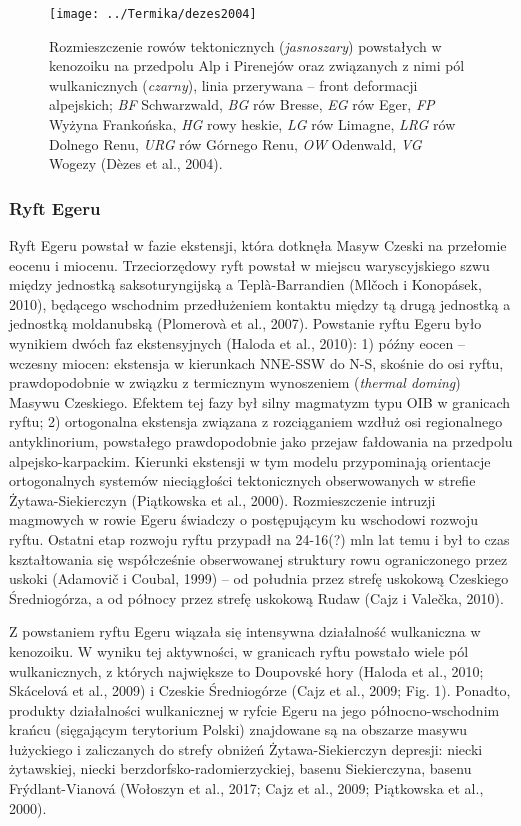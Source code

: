 \documentclass[11.5pt,twoside]{report}
\begin{document}
\begin{figure}[h]
	\centering
	\texttt{[image: ../Termika/dezes2004]}
	\caption{Rozmieszczenie rowów tektonicznych (\textit{jasnoszary}) powstałych w kenozoiku na przedpolu Alp i Pirenejów oraz związanych z nimi pól wulkanicznych (\textit{czarny}), linia przerywana -- front deformacji alpejskich; \textit{BF} Schwarzwald, \textit{BG} rów Bresse, \textit{EG} rów Eger, \textit{FP} Wyżyna Frankońska, \textit{HG} rowy heskie, \textit{LG} rów Limagne, \textit{LRG} rów Dolnego Renu, \textit{URG} rów Górnego Renu, \textit{OW} Odenwald, \textit{VG} Wogezy (D\`{e}zes et al., 2004).}
\label{Fig.}
\end{figure}

\subsubsection{Ryft Egeru}

Ryft Egeru powstał w fazie ekstensji, która dotknęła Masyw Czeski na przełomie eocenu i miocenu. Trzeciorzędowy ryft powstał w miejscu waryscyjskiego szwu między jednostką saksoturyngijską a Tepl\`{a}-Barrandien (Mlčoch i Konop\'{a}sek, 2010), będącego wschodnim przedłużeniem kontaktu między tą drugą jednostką a jednostką moldanubską (Plomerov\`{a} et al., 2007). Powstanie ryftu Egeru było wynikiem dwóch faz ekstensyjnych (Haloda et al., 2010): 1) pó\'{z}ny eocen -- wczesny miocen: ekstensja w kierunkach NNE-SSW do N-S, skośnie do osi ryftu, prawdopodobnie w związku z termicznym wynoszeniem (\textit{thermal doming}) Masywu Czeskiego. Efektem tej fazy był silny magmatyzm typu OIB w granicach ryftu; 2) ortogonalna ekstensja związana z rozciąganiem wzdłuż osi regionalnego antyklinorium, powstałego prawdopodobnie jako przejaw fałdowania na przedpolu alpejsko-karpackim. Kierunki ekstensji w tym modelu przypominają orientacje ortogonalnych systemów nieciągłości tektonicznych obserwowanych w strefie Żytawa-Siekierczyn (Piątkowska et al., 2000). Rozmieszczenie intruzji magmowych w rowie Egeru świadczy o postępującym ku wschodowi rozwoju ryftu. Ostatni etap rozwoju ryftu przypadł na 24-16(?) mln lat temu i był to czas kształtowania się współcześnie obserwowanej struktury rowu ograniczonego przez uskoki (Adamovič i Coubal, 1999) -- od południa przez strefę uskokową Czeskiego Średniogórza, a od północy przez strefę uskokową Rudaw (Cajz i Valečka, 2010).

Z powstaniem ryftu Egeru wiązała się intensywna działalność wulkaniczna w kenozoiku. W wyniku tej aktywności, w granicach ryftu powstało wiele pól wulkanicznych, z których największe to Doupovsk\'{e} hory (Haloda et al., 2010; Skácelová et al., 2009) i Czeskie Średniogórze (Cajz et al., 2009; Fig. 1). Ponadto, produkty działalności wulkanicznej w ryfcie Egeru na jego północno-wschodnim krańcu (sięgającym terytorium Polski) znajdowane są na obszarze masywu łużyckiego i zaliczanych do strefy obniżeń Żytawa-Siekierczyn depresji: niecki żytawskiej, niecki berzdorfsko-radomierzyckiej, basenu Siekierczyna, basenu Fr\'{y}dlant-Vianov\'{a} (Wołoszyn et al., 2017; Cajz et al., 2009; Piątkowska et al., 2000). 
\end{document}
